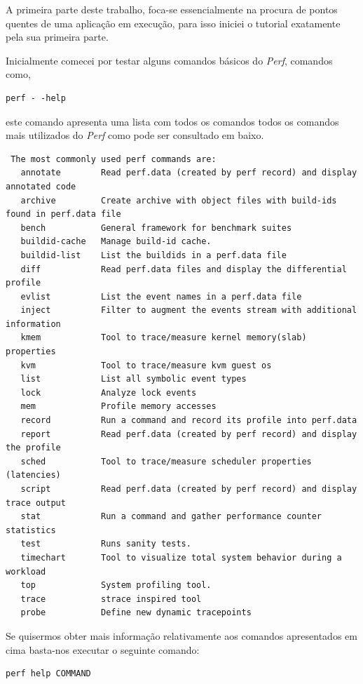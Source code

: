 \documentclass[conference,compsoc]{IEEEtran}
\begin{document}
A primeira parte deste trabalho, foca-se essencialmente na procura de pontos quentes de uma aplicação em execução, para isso iniciei o tutorial exatamente pela sua primeira parte. 

Inicialmente comecei por testar alguns comandos básicos do \textit{Perf}, comandos como,

\begin{lstlisting}
perf - -help
\end{lstlisting}

este comando apresenta uma lista com todos os comandos todos os comandos mais utilizados do \textit{Perf} como pode ser consultado em baixo.

\begin{lstlisting}
 The most commonly used perf commands are:
   annotate        Read perf.data (created by perf record) and display annotated code
   archive         Create archive with object files with build-ids found in perf.data file
   bench           General framework for benchmark suites
   buildid-cache   Manage build-id cache.
   buildid-list    List the buildids in a perf.data file
   diff            Read perf.data files and display the differential profile
   evlist          List the event names in a perf.data file
   inject          Filter to augment the events stream with additional information
   kmem            Tool to trace/measure kernel memory(slab) properties
   kvm             Tool to trace/measure kvm guest os
   list            List all symbolic event types
   lock            Analyze lock events
   mem             Profile memory accesses
   record          Run a command and record its profile into perf.data
   report          Read perf.data (created by perf record) and display the profile
   sched           Tool to trace/measure scheduler properties (latencies)
   script          Read perf.data (created by perf record) and display trace output
   stat            Run a command and gather performance counter statistics
   test            Runs sanity tests.
   timechart       Tool to visualize total system behavior during a workload
   top             System profiling tool.
   trace           strace inspired tool
   probe           Define new dynamic tracepoints
\end{lstlisting}

Se quisermos obter mais informação relativamente aos comandos apresentados em cima basta-nos executar o seguinte comando:

\begin{lstlisting}
perf help COMMAND
\end{lstlisting}
\end{document}
